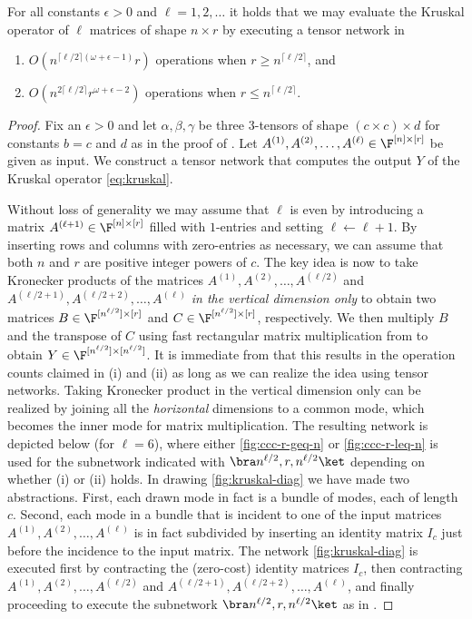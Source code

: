 \begin{lemma}
\label{lem:kruskal}
For all constants $\epsilon>0$ and $\ell=1,2,\ldots$
it holds that we may evaluate the Kruskal operator
of $\ell$ matrices of shape $n\times r$ by executing a tensor network in
\begin{enumerate}%
\item
$O(n^{\lceil\ell/2\rceil(\omega+\epsilon-1)}r)$ operations when $r\geq n^{\lceil \ell/2\rceil}$, and
\item
$O(n^{2\lceil\ell/2\rceil}r^{\omega+\epsilon-2})$ operations when $r\leq n^{\lceil \ell/2\rceil}$.
\end{enumerate}
\end{lemma}
\begin{proof}
Fix an $\epsilon>0$ and let $\alpha,\beta,\gamma$ be three 3-tensors
of shape $(c\times c)\times d$ for constants $b=c$ and $d$
as in the proof of .
Let $A^{(1)},A^{(2)},\ldots,A^{(\ell)}\in\F^{[n]\times[r]}$ be given as input.
We construct a tensor network that computes the output $Y$ of the
Kruskal operator \eqref{eq:kruskal}.

Without loss of generality we may assume that $\ell$ is even by
introducing a matrix $A^{(\ell+1)}\in\F^{[n]\times[r]}$ filled with
$1$-entries and setting $\ell\leftarrow\ell+1$. By inserting
rows and columns with zero-entries as necessary,
we can assume that both $n$ and $r$ are positive integer powers of $c$.
The key idea is now to take Kronecker products of the matrices
$A^{(1)},A^{(2)},\ldots,A^{(\ell/2)}$ and
$A^{(\ell/2+1)},A^{(\ell/2+2)},\ldots,A^{(\ell)}$
\emph{in the vertical dimension only} to obtain two matrices
$B\in\F^{[n^{\ell/2}]\times [r]}$
and
$C\in\F^{[n^{\ell/2}]\times [r]}$,
respectively. We then multiply $B$ and the transpose of $C$ using fast
rectangular matrix multiplication from  to obtain
$Y\in\F^{[n^{\ell/2}]\times [n^{\ell/2}]}$. It is immediate from
 that this
results in the operation counts claimed in (i) and (ii) as long as we
can realize the idea using tensor networks.
Taking Kronecker product in the vertical dimension only can be realized by joining
all the \emph{horizontal} dimensions to a common mode, which becomes the
inner mode for matrix multiplication. The resulting network is
depicted below (for $\ell=6$), where either \eqref{fig:ccc-r-geq-n}
or \eqref{fig:ccc-r-leq-n} is used for the
subnetwork indicated with $\bra n^{\ell/2},r,n^{\ell/2}\ket$
depending on whether (i) or (ii) holds.
In drawing \eqref{fig:kruskal-diag} we have made two abstractions. First,
each drawn mode in fact is a bundle of modes, each of length $c$.
Second, each mode in a bundle that is incident to one of the input matrices
$A^{(1)},A^{(2)},\ldots,A^{(\ell)}$ is in fact subdivided by inserting
an identity matrix $I_c$ just before the incidence to the input matrix.
The network \eqref{fig:kruskal-diag} is executed first by contracting
the (zero-cost) identity matrices $I_c$, then contracting
$A^{(1)},A^{(2)},\ldots,A^{(\ell/2)}$ and
$A^{(\ell/2+1)},A^{(\ell/2+2)},\ldots,A^{(\ell)}$, and finally proceeding
to execute the subnetwork $\bra n^{\ell/2},r,n^{\ell/2}\ket$ as
in .
\end{proof}


